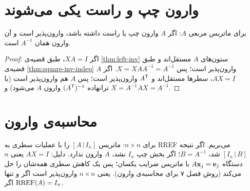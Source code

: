 \section{وارون چپ و راست یکی می‌شوند}

\begin{theorem}\label{thm:left-right-square}
برای ماتریس مربعی $A$: اگر $A$ وارون چپ یا راست داشته باشد، وارون‌پذیر است و آن وارون همان $A^{-1}$ است.
\end{theorem}
\begin{proof}
اگر $XA=I$، طبق قضیه‌ی \ref{thm:left-inv} ستون‌های $A$ مستقل‌اند و طبق قضیه‌ی \ref{thm:square-inv-indep} $A$ وارون‌پذیر است؛ پس $X=XAA^{-1}=A^{-1}$. اگر $AX=I$، سطرها مستقل‌اند و $A^{\mathsf{T}}$ وارون‌پذیر است؛ پس $A$ هم وارون‌پذیر است (با ترانهاده  $(A^{\mathsf{T}})^{-1}$ وارون $A$ می‌شود) و $X=A^{-1}AX=A^{-1}$.
\end{proof}

\begin{center}
\end{center}

\section{محاسبه‌ی وارون}

برای $n\times n$: ماتریس $[A\,|\,I_n]$ را با عملیات سطری  به RREF می‌بریم. اگر نتیجه $[I_n\,|\,B]$ شد، $B=A^{-1}$؛ اگر بخش چپ $I_n$ نشد، $A$ وارون ندارد. دلیل: $AX=I$ یعنی $n$ دستگاه $A\mathbf{x}_j=\mathbf{e}_j$ با ماتریس ضرایب  یکسان؛ پس یک کاهش سطری همه‌شان را حل می‌کند (روش فصل ۷ برای محاسبه‌ی وارون). یعنی $n\times n$ وارون‌پذیر است اگر و تنها اگر $\operatorname{RREF}(A)=I_n$.

